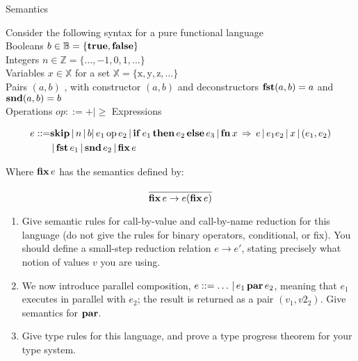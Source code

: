 \documentclass{tripos}  %
\begin{document}
\begin{question}[MockIB,year=2024,paper=2,question=7,author=rrw]{Semantics}


  Consider the following syntax for a pure functional language\\

  Booleans $b \in \mathbb{B} = \{ \mbox{\textbf{true}}, \mbox{\textbf{false}} \}$ \\
  Integers $n \in \mathbb{Z} = \{ \dots{}, -1, 0, 1, \dots{} \}$\\
  Variables $x \in \mathbb{X}$ for a set $\mathbb{X} = \{ \mbox{x}, \mbox{y}, \mbox{z}, \dots{} \}$ \\
  Pairs $(a,b)$ , with constructor $(a,b)$ and deconstructors $\mbox{\textbf{fst}} (a,b) = a$ and $\mbox{\textbf{snd}} (a,b) = b$ \\
  Operations $ op ::= + | \ge$
  Expressions


\[
    \begin{split}
  e ::= & \mbox{\textbf{skip}}\, |\, n\, |\, b |\, e_1\, \mbox{op}\, e_2 \,|\, \mbox{\textbf{if}}\, e_1\, \mbox{\textbf{then}}\, e_2\, \mbox{\textbf{else}}\, e_3\, |\, \mbox{\textbf{fn}}\, x\, \Rightarrow\, e \,|\, e_1 e_2\, |\, x \,|\, (e_1,e_2)\\
    & \,|\, \mbox{\textbf{fst}}\, e_1 \,|\, \mbox{\textbf{snd}}\, e_2\, | \,\mbox{\textbf{fix}}\, e
  \end{split}
\]

  Where $\mbox{\textbf{fix}}\, e$ has the semantics defined by:

  \[
  \frac{}{\mbox{\textbf{fix}}\, e \rightarrow e(\mbox{\textbf{fix}}\, e)}
  \]

  \begin{enumerate}
  \item Give semantic rules for call-by-value and call-by-name reduction for this language (do not give the rules for binary operators, conditional, or fix). You should define a small-step reduction relation $e \rightarrow e'$, stating precisely what notion of values $v$ you are using. 
  \item We now introduce parallel composition, $ e ::= \dots{}\, |\, e_1\, \mbox{\textbf{par}}\, e_2 $, meaning that $e_1$ executes in parallel with $e_2$; the result is returned as a pair $(v_1, v2_2)$. Give semantics for $\mbox{\textbf{par}}$.
  \item Give type rules for this language, and prove a type progress theorem for your type system. 
    \end{enumerate}

\end{question}
\end{document}
